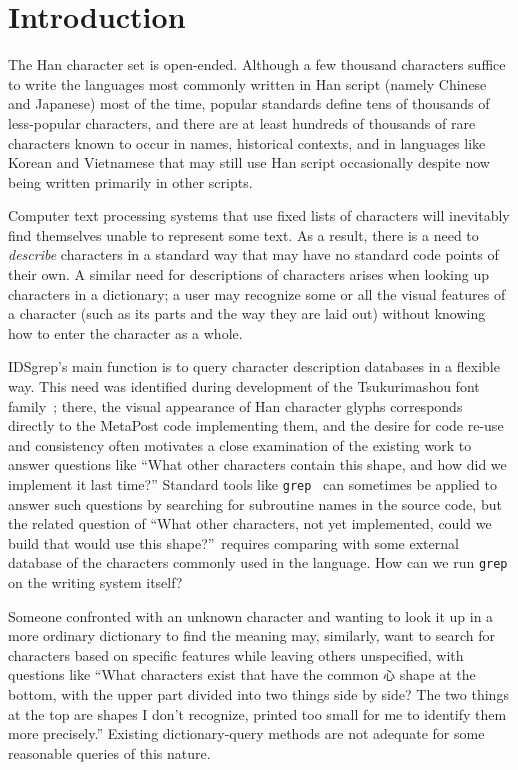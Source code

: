 \documentclass[twocolumn]{report}
\begin{document}

\chapter{Introduction}

\noindent
The Han character set is open-ended.  Although a few thousand characters
suffice to write the languages most commonly written in Han script
(namely Chinese and Japanese) most of the time, popular standards define
tens of thousands of less-popular characters, and there are at least
hundreds of thousands of rare characters known to occur in names, historical
contexts, and in languages like Korean and Vietnamese that may still use Han
script occasionally despite now being written primarily in other scripts.

Computer text processing systems that use fixed lists of characters will
inevitably find themselves unable to represent some text.  As a result,
there is a need to \emph{describe} characters in a standard way that may
have no standard code points of their own.  A similar need for descriptions
of characters arises when looking up characters in a dictionary; a user may
recognize some or all the visual features of a character (such as its parts
and the way they are laid out) without knowing how to enter the character as
a whole.

IDSgrep's main function is to query character description databases in a
flexible way.  This need was identified during development of the
Tsukurimashou font family~\cite{Tsukurimashou}; there, the visual appearance
of Han character glyphs corresponds directly to the MetaPost code
implementing them, and the desire for code re-use and consistency often
motivates a close examination of the existing work to answer questions like
``What other characters contain this shape, and how did we implement it last
time?'' Standard tools like \texttt{grep}~\cite{grep} can sometimes be
applied to answer such questions by searching for subroutine names in the
source code, but the related question of ``What other characters, not yet
implemented, could we build that would use this shape?''\ requires comparing
with some external database of the characters commonly used in the language. 
How can we run \texttt{grep} on the writing system itself?

Someone confronted with an unknown character and wanting to look it up in a
more ordinary dictionary to find the meaning may, similarly, want to search
for characters based on specific features while leaving others unspecified,
with questions like ``What characters exist that have the common \texttt{心}
shape at the bottom, with the upper part divided into two things side by
side?  The two things at the top are shapes I don't recognize, printed too
small for me to identify them more precisely.'' Existing dictionary-query
methods are not adequate for some reasonable queries of this nature.
\end{document}
